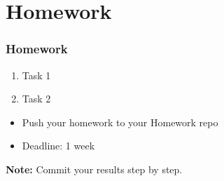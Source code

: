 \documentclass{beamer}
\begin{document}



    

\section{Homework} 

\begin{frame}
    \frametitle{Homework}
    \begin{enumerate}
        \item Task 1
        \item Task 2
    \end{enumerate}

    \vskip 2mm
    \begin{itemize}
        \item Push your homework to your Homework repo
        \item Deadline: 1 week %
    \end{itemize}

\vfill
\textbf{Note:} Commit your results step by step.
\end{frame}
\end{document}
